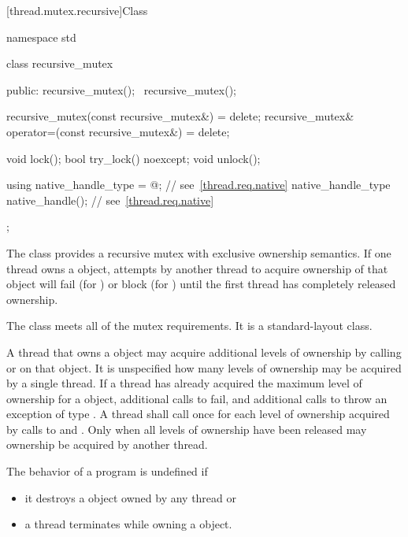 [thread.mutex.recursive]{Class }

%
\begin{codeblock}
namespace std {
  class recursive_mutex {
  public:
    recursive_mutex();
    ~recursive_mutex();

    recursive_mutex(const recursive_mutex&) = delete;
    recursive_mutex& operator=(const recursive_mutex&) = delete;

    void lock();
    bool try_lock() noexcept;
    void unlock();

    using native_handle_type = @\impdefnc@;          // see~\ref{thread.req.native}
    native_handle_type native_handle();                         // see~\ref{thread.req.native}
  };
}
\end{codeblock}

\pnum
{}%
The class  provides a recursive mutex with exclusive ownership
semantics. If one thread owns a  object, attempts by another
thread to acquire ownership of that object will fail (for ) or block
(for ) until the first thread has completely released ownership.

\pnum
The class  meets
all of the mutex requirements.
It is a standard-layout class.

\pnum
A thread that owns a  object may acquire additional levels of
ownership by calling  or  on that object. It is
unspecified how many levels of ownership may be acquired by a single thread. If a thread
has already acquired the maximum level of ownership for a 
object, additional calls to  fail, and additional calls to
 throw an exception of type . A thread
shall call  once for each level of ownership acquired by calls to
 and . Only when all levels of ownership have been
released may ownership be acquired by another thread.

\pnum
The behavior of a program is undefined if
\begin{itemize}
\item it destroys a  object owned by any thread or
\item a thread terminates while owning a  object.
\end{itemize}

